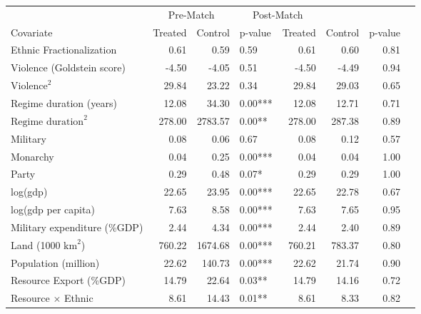 \begin{sidewaystable}
\centering
\begin{tabular}{lrrlrrrl}
  \hline
 & \multicolumn{2}{c}{Pre-Match} &   \multicolumn{2}{c}{Post-Match} \\
Covariate & Treated & Control & p-value & Treated & Control & p-value &  \\ 
  \hline
Ethnic Fractionalization & 0.61 & 0.59 & 0.59 & 0.61 & 0.60 & 0.81 &  \\ 
Violence (Goldstein score) & -4.50 & -4.05 & 0.51 & -4.50 & -4.49 & 0.94 &  \\ 
$\text{Violence}^2$ & 29.84 & 23.22 & 0.34 & 29.84 & 29.03 & 0.65 &  \\ 
Regime duration (years) & 12.08 & 34.30 & 0.00*** & 12.08 & 12.71 & 0.71 &  \\ 
$\text{Regime duration}^2$ & 278.00 & 2783.57 & 0.00** & 278.00 & 287.38 & 0.89 &  \\ 
Military & 0.08 & 0.06 & 0.67 & 0.08 & 0.12 & 0.57 &  \\ 
Monarchy & 0.04 & 0.25 & 0.00*** & 0.04 & 0.04 & 1.00 &  \\ 
Party & 0.29 & 0.48 & 0.07* & 0.29 & 0.29 & 1.00 &  \\ 
log(gdp) & 22.65 & 23.95 & 0.00*** & 22.65 & 22.78 & 0.67 &  \\ 
log(gdp per capita) & 7.63 & 8.58 & 0.00*** & 7.63 & 7.65 & 0.95 &  \\ 
Military expenditure (\%GDP) & 2.44 & 4.34 & 0.00*** & 2.44 & 2.40 & 0.89 &  \\
Land (1000 $\text{km}^2$)& 760.22 & 1674.68 & 0.00*** & 760.21 & 783.37 & 0.80 &  \\ 
Population (million) & 22.62 & 140.73 & 0.00*** & 22.62 & 21.74 & 0.90 &  \\
Resource Export (\%GDP) & 14.79 & 22.64 & 0.03** & 14.79 & 14.16 & 0.72 &  \\ 
Resource $\times$ Ethnic & 8.61 & 14.43 & 0.01** & 8.61 & 8.33 & 0.82 & \\
  \hline
\end{tabular}
\end{sidewaystable}
\label{tab:matching_balance_largen}


